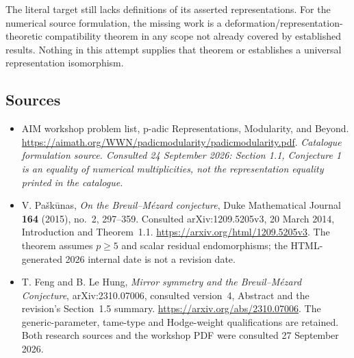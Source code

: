 \documentclass[11pt,a4paper]{article}
\numberwithin{equation}{section}
\begin{document}
The literal target still lacks definitions of its asserted
representations. For the numerical source formulation, the missing work
is a deformation/representation-theoretic compatibility theorem in any
scope not already covered by established results. Nothing in this
attempt supplies that theorem or establishes a universal representation
isomorphism.
\subsection{Sources}
\begin{itemize}\raggedright
\item[\textnormal{[S1]}]\hypertarget{source:30006981:1}{} AIM workshop problem list, p-adic Representations, Modularity, and Beyond.
\url{https://aimath.org/WWN/padicmodularity/padicmodularity.pdf}.
{\small\textit{Catalogue formulation source. Consulted 24 September 2026: Section 1.1, Conjecture 1 is an equality of numerical multiplicities, not the representation equality printed in the catalogue.}}
\item[\textnormal{[E1]}]\hypertarget{extra:30006981:1}{}
V. Pa\v{s}k\=unas, \emph{On the Breuil--M\'ezard conjecture},
Duke Mathematical Journal \textbf{164} (2015), no.~2, 297--359.
Consulted arXiv:1209.5205v3, 20 March 2014, Introduction and
Theorem~1.1. \url{https://arxiv.org/html/1209.5205v3}.
The theorem assumes $p\ge5$ and scalar residual endomorphisms; the
HTML-generated 2026 internal date is not a revision date.
\item[\textnormal{[E2]}]\hypertarget{extra:30006981:2}{}
T. Feng and B. Le Hung, \emph{Mirror symmetry and the Breuil--M\'ezard
Conjecture}, arXiv:2310.07006, consulted version~4, Abstract and the
revision's Section~1.5 summary. \url{https://arxiv.org/abs/2310.07006}.
The generic-parameter, tame-type and Hodge-weight qualifications are
retained. Both research sources and the workshop PDF were consulted
27 September 2026.
\end{itemize}
\end{document}
